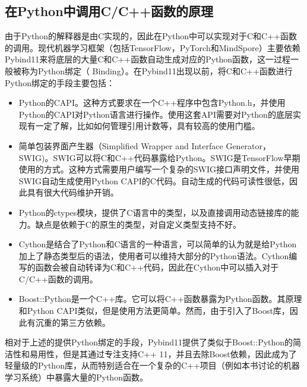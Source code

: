 \documentclass[letterpaper,10pt,english]{sphinxmanual}
\begin{document}
\subsection{在Python中调用C/C++函数的原理}
\label{\detokenize{chapter_programming_interface/c_python_interaction:pythonc-c}}
\sphinxAtStartPar
由于Python的解释器是由C实现的，因此在Python中可以实现对于C和C++函数的调用。现代机器学习框架（包括TensorFlow，PyTorch和MindSpore）主要依赖Pybind11来将底层的大量C和C++函数自动生成对应的Python函数，这一过程一般被称为Python绑定（
Binding）。在Pybind11出现以前，将C和C++函数进行Python绑定的手段主要包括：
\begin{itemize}
\item {} 
\sphinxAtStartPar
Python的C\sphinxhyphen{}API。这种方式要求在一个C++程序中包含Python.h，并使用Python的C\sphinxhyphen{}API对Python语言进行操作。使用这套API需要对Python的底层实现有一定了解，比如如何管理引用计数等，具有较高的使用门槛。

\item {} 
\sphinxAtStartPar
简单包装界面产生器（Simplified Wrapper and Interface
Generator，SWIG)。SWIG可以将C和C++代码暴露给Python。SWIG是TensorFlow早期使用的方式。这种方式需要用户编写一个复杂的SWIG接口声明文件，并使用SWIG自动生成使用Python
C\sphinxhyphen{}API的C代码。自动生成的代码可读性很低，因此具有很大代码维护开销。

\item {} 
\sphinxAtStartPar
Python的ctypes模块，提供了C语言中的类型，以及直接调用动态链接库的能力。缺点是依赖于C的原生的类型，对自定义类型支持不好。

\item {} 
\sphinxAtStartPar
Cython是结合了Python和C语言的一种语言，可以简单的认为就是给Python加上了静态类型后的语法，使用者可以维持大部分的Python语法。Cython编写的函数会被自动转译为C和C++代码，因此在Cython中可以插入对于C/C++函数的调用。

\item {} 
\sphinxAtStartPar
Boost::Python是一个C++库。它可以将C++函数暴露为Python函数。其原理和Python
C\sphinxhyphen{}API类似，但是使用方法更简单。然而，由于引入了Boost库，因此有沉重的第三方依赖。

\end{itemize}

\sphinxAtStartPar
相对于上述的提供Python绑定的手段，Pybind11提供了类似于Boost::Python的简洁性和易用性，但是其通过专注支持C++
11，并且去除Boost依赖，因此成为了轻量级的Python库，从而特别适合在一个复杂的C++项目（例如本书讨论的机器学习系统）中暴露大量的Python函数。
\end{document}
